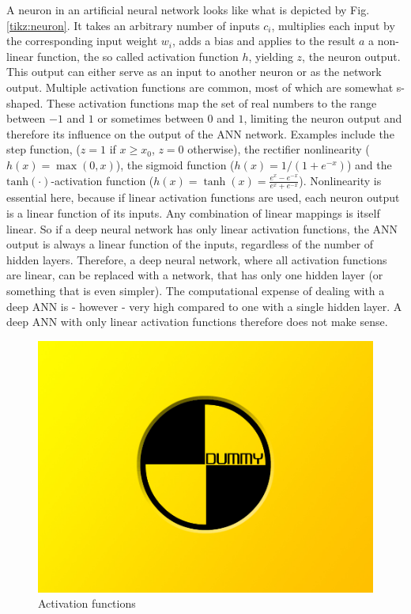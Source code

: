A neuron in an artificial neural network looks like what is depicted by Fig. \ref{tikz:neuron}. It takes an arbitrary number of inputs $c_i$, multiplies each input by the corresponding input weight $w_i$, adds a bias and applies to the result $a$ a non-linear function, the so called activation function $h$, yielding $z$, the neuron output. This output can either serve as an input to another neuron or as the network output. Multiple activation functions are common, most of which are somewhat s-shaped. These activation functions map the set of real numbers to the range between $-1$ and $1$ or sometimes between $0$ and $1$, limiting the neuron output and therefore its influence on the output of the ANN network. Examples include the step function, ($z=1$ if $x \geq x_0$, $z=0$ otherwise), the rectifier nonlinearity ($h(x)=\max(0,x)$), the sigmoid function ($h(x)=1/(1+e^{-x})$) and the $\text{tanh}(\cdot)$-activation function ($h(x)=\tanh(x)=\frac{e^x-e^{-x}}{e^x+e^{-x}}$).
Nonlinearity is essential here, because if linear activation functions are used, each neuron output is a linear function of its inputs. Any combination of linear mappings is itself linear. So if a deep neural network has only linear activation functions, the ANN output is always a linear function of the inputs, regardless of the number of hidden layers. Therefore, a deep neural network, where all activation functions are linear, can be replaced with a network, that has only one hidden layer (or something that is even simpler). The computational expense of dealing with a deep ANN is - however - very high compared to one with a single hidden layer. A deep ANN with only linear activation functions therefore does not make sense.

\begin{figure}[h]
	\includegraphics[width=\textwidth]{src/pics/dummy.jpg}
	\caption{Activation functions \cite{Zuern2017}}
	\label{fig:activation_functions} 
\end{figure}

